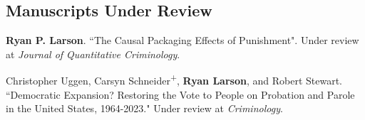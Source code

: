 \documentclass[letterpaper]{article}
\newenvironment{publist}{%
  \begin{list}{}{%
    \setlength{\leftmargin}{0cm}   %
    \setlength{\labelwidth}{2cm}     %
    \setlength{\labelsep}{0.5cm}     %
  }%
}{%
  \end{list}%
}
\begin{document}
\subsection*{Manuscripts Under Review}
\begin{publist}

\item \textbf{Ryan P. Larson}. ``The Causal Packaging Effects of Punishment". Under review at \textit{Journal of Quantitative Criminology}.

\item Christopher Uggen, Carsyn Schneider\textsuperscript{+}, \textbf{Ryan Larson}, and Robert Stewart. ``Democratic Expansion? Restoring the Vote to People on Probation and Parole in the United States, 1964-2023." Under review at \textit{Criminology}.


\end{publist}
\end{document}
